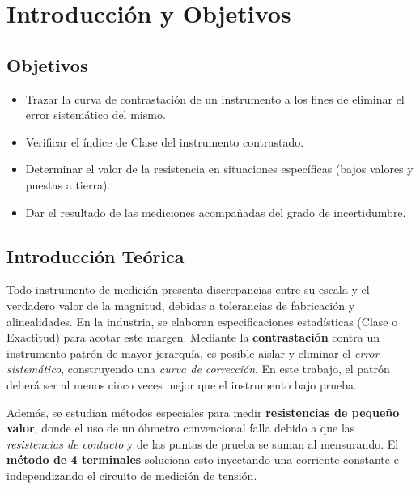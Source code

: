 \chapter{Introducción y Objetivos}

\section{Objetivos}
\begin{itemize}
    \item Trazar la curva de contrastación de un instrumento a los fines de eliminar el error sistemático del mismo.
    \item Verificar el índice de Clase del instrumento contrastado.
    \item Determinar el valor de la resistencia en situaciones específicas (bajos valores y puestas a tierra).
    \item Dar el resultado de las mediciones acompañadas del grado de incertidumbre.
\end{itemize}

\section{Introducción Teórica}
Todo instrumento de medición presenta discrepancias entre su escala y el verdadero valor de la magnitud, debidas a
tolerancias de fabricación y alinealidades. En la industria, se elaboran especificaciones estadísticas (Clase o
Exactitud) para acotar este margen. Mediante la \textbf{contrastación} contra un instrumento patrón de mayor jerarquía,
es posible aislar y eliminar el \textit{error sistemático}, construyendo una \textit{curva de corrección}. En este
trabajo, el patrón deberá ser al menos cinco veces mejor que el instrumento bajo prueba.

Además, se estudian métodos especiales para medir \textbf{resistencias de pequeño valor}, donde el uso de un óhmetro
convencional falla debido a que las \textit{resistencias de contacto} y de las puntas de prueba se suman al mensurando.
El \textbf{método de 4 terminales} soluciona esto inyectando una corriente constante e independizando el circuito de
medición de tensión. 
